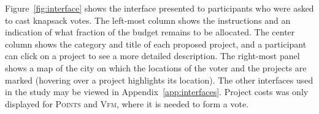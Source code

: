 \documentclass{comsoc2023}
\newcommand{\points}{\textsc{Points}}
\newcommand{\vfm}{\textsc{Vfm}}
\begin{document}
 




 Figure~\ref{fig:interface} shows the interface  presented to participants who were asked to cast knapsack votes. 
 The left-most column shows the instructions and an indication of what fraction of the budget remains to be allocated. The center column shows the category and title of each proposed project, and a participant can click on a project to see a more detailed description. The right-most panel shows a map of the city on which the locations of the voter and the projects are marked (hovering over a project highlights its location). The other interfaces used in the study may be viewed in Appendix~\ref{app:interfaces}. Project costs was only displayed for \points{} and \vfm{}, where it is needed to form a vote. %



 
\end{document}
